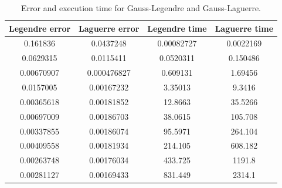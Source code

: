 \documentclass{article}
\begin{document}
  \begin{table}[ht] \label{tab:error-Gauss}
    \centering
      \caption{Error and execution time for Gauss-Legendre and Gauss-Laguerre.}
      \vspace{2mm}
      \begin{tabular}{|c|c|c|c|}
        \hline
        Legendre error & Laguerre error & Legendre time & Laguerre time   \\
        \hline \hline
        0.161836 & 0.0437248 & 0.00082727 & 0.0022169 \\
        0.0629315 & 0.0115411 & 0.0520311 & 0.150486 \\
        0.00670907 & 0.000476827 & 0.609131 & 1.69456 \\
        0.0157005 & 0.00167232 & 3.35013 & 9.3416 \\
        0.00365618 & 0.00181852 & 12.8663 & 35.5266 \\
        0.00697009 & 0.00186703 & 38.0615 & 105.708 \\
        0.00337855 & 0.00186074 & 95.5971 & 264.104 \\
        0.00409558 & 0.00181934 & 214.105 & 608.182 \\
        0.00263748 & 0.00176034 & 433.725 & 1191.8 \\
        0.00281127 & 0.00169433 & 831.449 & 2314.1 \\
        \hline
      \end{tabular} \\
      \hspace{0pt}\\
  \end{table}
\end{document}
